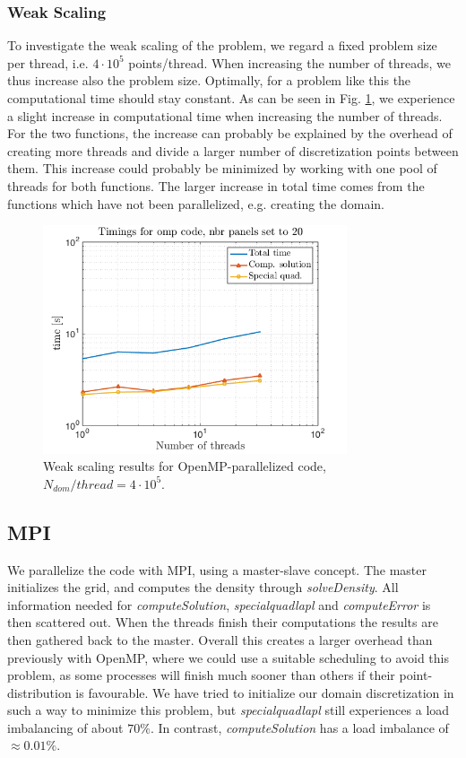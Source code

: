 \documentclass[a4paper,10pt]{article}
\begin{document}
\subsubsection*{Weak Scaling}
To investigate the weak scaling of the problem, we regard a fixed problem size per thread, i.e. $4\cdot10^5$ points/thread. When increasing the number of threads, we thus increase also the problem size. Optimally, for a problem like this the computational time should stay constant. As can be seen in Fig. \ref{fig:omp_weaktime}, we experience a slight increase in computational time when increasing the number of threads. For the two functions, the increase can probably be explained by the overhead of creating more threads and divide a larger number of discretization points between them. This increase could probably be minimized by working with one pool of threads for both functions.  The larger increase in total time comes from the functions which have not been parallelized, e.g. creating the domain. 
\begin{figure}[ht]
    \begin{center}
        \includegraphics[width=0.8\textwidth]{Graphics/omp_fixed_pntsPerThread_size_loglog.png}
    \end{center}
    \caption{Weak scaling results for OpenMP-parallelized code, $N_{dom}/thread=4\cdot 10^5$.}
    \label{fig:omp_weaktime}
\end{figure}

\FloatBarrier


\subsection*{MPI}
We parallelize the code with MPI, using a master-slave concept. The master initializes the grid, and computes the density through \textit{solveDensity}. All information needed for \textit{computeSolution}, \textit{specialquadlapl} and \textit{computeError} is then scattered out. When the threads finish their computations the results are then gathered back to the master. Overall this creates a larger overhead than previously with OpenMP, where we could use a suitable scheduling to avoid this problem, as some processes will finish much sooner than others if their point-distribution is favourable. We have tried to initialize our domain discretization in such a way to minimize this problem, but \textit{specialquadlapl} still experiences a load imbalancing of about $70\%$. In contrast, \textit{computeSolution} has a load imbalance of $\approx0.01\%$. 
\end{document}
